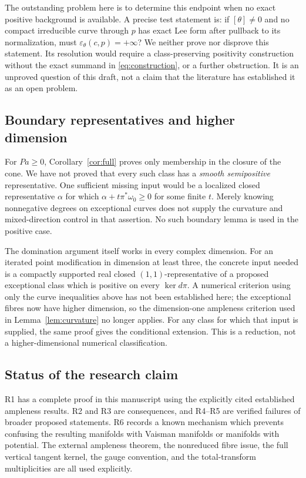 \documentclass[12pt]{amsart}
\theoremstyle{definition}
\theoremstyle{remark}
\numberwithin{equation}{section}
\begin{document}
The outstanding problem here is to determine this endpoint when no exact positive background is available. A precise test statement is: if $[\theta]\ne0$ and no compact irreducible curve through $p$ has exact Lee form after pullback to its normalization, must $\varepsilon_\theta(c,p)=+\infty$? We neither prove nor disprove this statement. Its resolution would require a class-preserving positivity construction without the exact summand in \eqref{eq:construction}, or a further obstruction. It is an unproved question of this draft, not a claim that the literature has established it as an open problem.

\subsection{Boundary representatives and higher dimension}
For $Pa\geq0$, Corollary~\ref{cor:full} proves only membership in the closure of the cone. We have not proved that every such class has a \emph{smooth semipositive} representative. One sufficient missing input would be a localized closed representative $\alpha$ for which $\alpha+t\pi^*\omega_0\geq0$ for some finite $t$. Merely knowing nonnegative degrees on exceptional curves does not supply the curvature and mixed-direction control in that assertion. No such boundary lemma is used in the positive case.

The domination argument itself works in every complex dimension. For an iterated point modification in dimension at least three, the concrete input needed is a compactly supported real closed $(1,1)$-representative of a proposed exceptional class which is positive on every $\ker d\pi$. A numerical criterion using only the curve inequalities above has not been established here; the exceptional fibres now have higher dimension, so the dimension-one ampleness criterion used in Lemma~\ref{lem:curvature} no longer applies. For any class for which that input is supplied, the same proof gives the conditional extension. This is a reduction, not a higher-dimensional numerical classification.

\subsection{Status of the research claim}
R1 has a complete proof in this manuscript using the explicitly cited established ampleness results. R2 and R3 are consequences, and R4--R5 are verified failures of broader proposed statements. R6 records a known mechanism which prevents confusing the resulting manifolds with Vaisman manifolds or manifolds with potential. The external ampleness theorem, the nonreduced fibre issue, the full vertical tangent kernel, the gauge convention, and the total-transform multiplicities are all used explicitly.
\end{document}
